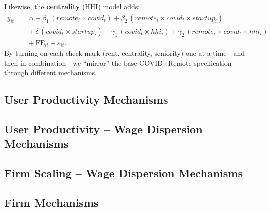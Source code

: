 \documentclass{article}
\newcommand{\cleanedresultsdir}{../results/cleaned}
\begin{document}
Likewise, the \textbf{centrality} (HHI) model adds:
\[
\begin{aligned}
y_{it} &= \alpha 
  + \beta_1\,(remote_i \times covid_t)
  + \beta_2\,(remote_i \times covid_t \times startup_i) \\
       &\quad
  + \delta\,(covid_t \times startup_i)
  + \gamma_1\,(covid_t \times hhi_i)
  + \gamma_2\,(remote_i \times covid_t \times hhi_i) \\
       &\quad
  + \mathrm{FE}_{it}
  + \varepsilon_{it}.
\end{aligned}
\]
By turning on each check‐mark (rent, centrality, seniority) one at a time—and
then in combination—we “mirror” the base COVID×Remote specification through
different mechanisms.



	\clearpage
	\begin{landscape}
	\subsection{User Productivity Mechanisms}
	
	\end{landscape}

\clearpage
\begin{landscape}
\subsection{User Productivity – Wage Dispersion Mechanisms}

\end{landscape}

\clearpage
\begin{landscape}
\subsection{Firm Scaling – Wage Dispersion Mechanisms}

\end{landscape}

\clearpage
\begin{landscape}
\subsection{Firm Mechanisms}

  \end{landscape}

\end{document}
